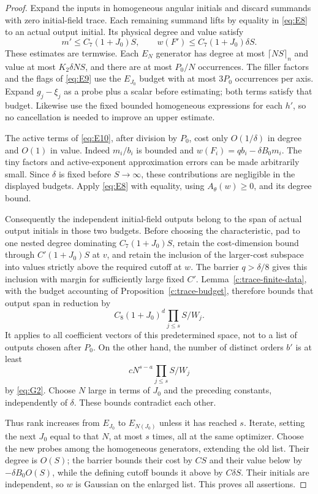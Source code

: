 \begin{proof}
Expand the inputs in homogeneous angular initials and
discard summands with zero initial-field trace.
Each remaining summand lifts by equality in
\eqref{eq:E8} to an actual output initial.
Its physical degree and value satisfy
\[
       m'\le C_7(1+J_0)S,\qquad
       w(F')\le C_7(1+J_0)\delta S.
\]
These estimates are termwise.  Each \(E_N\) generator has
degree at most \(\lceil NS\rceil_n\) and value at most
\(K_2\delta NS\), and there are at most \(P_0/N\)
occurrences.  The filler factors and the flags of
\eqref{eq:E9} use the \(E_{J_0}\) budget with at most
\(3P_0\) occurrences per axis.  Expand \(g_j-\xi_j\)
as a probe plus a scalar before estimating; both terms
satisfy that budget.  Likewise use the fixed bounded
homogeneous expressions for each \(h'\), so no
cancellation is needed to improve an upper estimate.

The active terms of \eqref{eq:E10}, after division by \(P_0\),
cost only \(O(1/\delta)\) in degree and \(O(1)\) in value.
Indeed \(m_i/b_i\) is bounded and
\(w(F_i)=qb_i-\delta B_0m_i\).
The tiny factors and active-exponent approximation errors
can be made arbitrarily small.  Since \(\delta\) is fixed
before \(S\to\infty\), these contributions are negligible
in the displayed budgets.  Apply \eqref{eq:E8} with
equality, using \(A_\theta(w)\ge0\), and its degree bound.

Consequently the independent initial-field outputs belong
to the span of actual output initials in those two budgets.
Before choosing the characteristic, pad to one nested
degree dominating \(C_7(1+J_0)S\), retain the cost-dimension
bound through \(C'(1+J_0)S\) at \(v\), and retain the
inclusion of the larger-cost subspace into values strictly
above the required cutoff at \(w\).
The barrier \(q>\delta/8\) gives this inclusion with margin
for sufficiently large fixed \(C'\).  Lemma~\ref{c:trace-finite-data}, with the budget
accounting of Proposition~\ref{c:trace-budget}, therefore
bounds that output span in reduction by
\[
                 C_8(1+J_0)^d\prod_{j\le s}S/W_j.
\]
It applies to all coefficient vectors of this predetermined
space, not to a list of outputs chosen after \(P_0\).
On the other hand, the number of distinct orders \(b'\)
is at least
\[
                       cN^{s-a}\prod_{j\le s}S/W_j
\]
by \eqref{eq:G2}.  Choose \(N\) large in terms of \(J_0\)
and the preceding constants, independently of \(\delta\).
These bounds contradict each other.

Thus rank increases from \(E_{J_0}\) to \(E_{N(J_0)}\)
unless it has reached \(s\).  Iterate, setting the next
\(J_0\) equal to that \(N\), at most \(s\) times, all at
the same optimizer.  Choose the new probes among the
homogeneous generators, extending the old list.
Their degree is \(O(S)\); the barrier bounds their
cost by \(CS\) and their value below by
\(-\delta B_0 O(S)\), while the defining cutoff bounds
it above by \(C\delta S\).  Their initials are independent,
so \(w\) is Gaussian on the enlarged list.  This proves
all assertions.
\end{proof}

